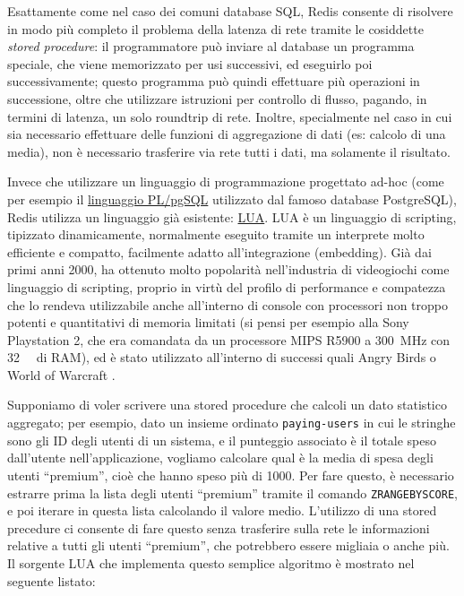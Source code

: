 Esattamente come nel caso dei comuni database SQL, Redis consente di risolvere in modo più completo
il problema della latenza di rete tramite le cosiddette \emph{stored procedure}: il programmatore
può inviare al database un programma speciale, che viene memorizzato per usi successivi, ed
eseguirlo poi successivamente; questo programma può quindi effettuare più operazioni in successione,
oltre che utilizzare istruzioni per controllo di flusso, pagando, in termini di latenza, un solo
roundtrip di rete. Inoltre, specialmente nel caso in cui sia necessario effettuare delle funzioni di
aggregazione di dati (es: calcolo di una media), non è necessario trasferire via rete tutti i dati,
ma solamente il risultato.

Invece che utilizzare un linguaggio di programmazione progettato ad-hoc (come per esempio il
\href{https://www.postgresql.org/docs/9.6/static/plpgsql.html}{linguaggio PL/pgSQL} utilizzato dal
famoso database PostgreSQL), Redis utilizza un linguaggio già esistente:
\href{https://www.lua.org}{LUA}. LUA è un linguaggio di scripting, tipizzato dinamicamente,
normalmente eseguito tramite un interprete molto efficiente e compatto, facilmente adatto
all'integrazione (embedding). Già dai primi anni 2000, ha ottenuto molto popolarità nell'industria
di videogiochi come linguaggio di scripting, proprio in virtù del profilo di performance e
compatezza che lo rendeva utilizzabile anche all'interno di console con processori non troppo
potenti e quantitativi di memoria limitati (si pensi per esempio alla Sony Playstation 2, che era
comandata da un processore MIPS R5900 a \SI{300}{\mega\hertz} con \SI{32}{\mebi\byte} di RAM), ed è
stato utilizzato all'interno di successi quali Angry Birds \cite{lua-angry} o World of Warcraft
\cite{lua-wow}.

Supponiamo di voler scrivere una stored procedure che calcoli un dato statistico aggregato; per
esempio, dato un insieme ordinato \verb|paying-users| in cui le stringhe sono gli ID degli utenti di
un sistema, e il punteggio associato è il totale speso dall'utente nell'applicazione, vogliamo
calcolare qual è la media di spesa degli utenti ``premium'', cioè che hanno speso più di
\SI{1000}{\EUR}. Per fare questo, è necessario estrarre prima la lista degli utenti ``premium''
tramite il comando \verb|ZRANGEBYSCORE|, e poi iterare in questa lista calcolando il valore medio.
L'utilizzo di una stored precedure ci consente di fare questo senza trasferire sulla rete le
informazioni relative a tutti gli utenti ``premium'', che potrebbero essere migliaia o anche più. Il
sorgente LUA che implementa questo semplice algoritmo è mostrato nel seguente listato:

